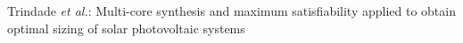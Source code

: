 \documentclass[10pt,journal,compsoc]{IEEEtran}
\begin{document}
%
{Trindade \MakeLowercase{\textit{et al.}}: Multi-core synthesis and maximum satisfiability applied to obtain optimal sizing of solar photovoltaic systems}
% 







\end{document}
